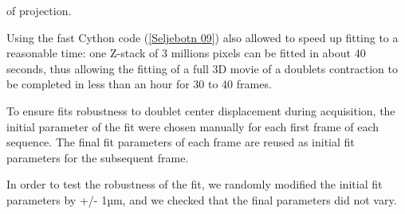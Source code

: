 \documentclass[A4paperpaper,11pt,english]{sphinxmanual}
\begin{document}
of projection.

Using the fast Cython code ({\hyperref[index-latex:seljebotn2009]{{[}Seljebotn 09{]}}}) also allowed to speed
up fitting to a reasonable time: one Z-stack of 3 millions pixels can be fitted
in about 40 seconds, thus allowing the fitting of a full 3D movie of a doublets
contraction to be completed in less than an hour for 30 to 40 frames.

To ensure fits robustness to doublet center displacement during
acquisition, the initial parameter of the fit were chosen manually for each
first frame of each sequence. The final fit parameters of each frame are reused
as initial fit parameters for the subsequent frame.

In order to test the robustness of the fit, we randomly modified the initial fit parameters by +/- 1µm, and we checked that the final parameters did
not vary.
\end{document}

